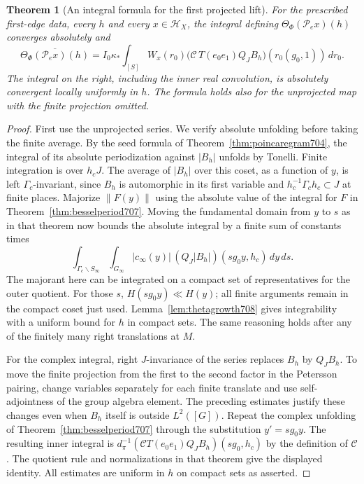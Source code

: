 \documentclass[a4paper,11pt]{article}
\newtheorem{theorem}[proposition]{Theorem}
\theoremstyle{definition}
\theoremstyle{remark}
\numberwithin{equation}{section}
\begin{document}
\begin{theorem}[An integral formula for the first projected lift]\leavevmode
\label{thm:firstlift708}
For the prescribed first-edge data, every \(h\) and every
\(x\in\mathcal H_X\), the integral defining
\(\Theta_\Phi(\mathcal P_e x)(h)\) converges absolutely and
\[
  \overline{\Theta_\Phi(\mathcal P_e x)(h)}
       = I_0\kappa_* \int_{[S]} W_x(r_0)
           \big(\mathcal C\,T(e_0e_1)Q_J B_h\big)
                           (r_0(g_0,1))\,dr_0 .
\]
The integral on the right, including the inner real
convolution, is absolutely convergent locally uniformly in
\(h\). The formula holds also for the unprojected map with the
finite projection omitted.
\end{theorem}
\begin{proof}
First use the unprojected series. We verify absolute
unfolding before taking the finite average. By the seed
formula of Theorem~\ref{thm:poincaregram704}, the integral
of its absolute periodization against \(|B_h|\) unfolds by
Tonelli. Finite integration is over \(h_cJ\). The average
of \(|B_h|\) over this coset, as a function of \(y\), is
left \(\Gamma_c\)-invariant, since \(B_h\) is automorphic
in its first variable and \(h_c^{-1}\Gamma_ch_c\subset J\)
at finite places. Majorize
\(\|F(y)\|\) using the absolute value of the integral for
\(F\) in Theorem~\ref{thm:besselperiod707}. Moving the
fundamental domain from \(y\) to \(s\) as in that theorem
now bounds the absolute integral by a finite sum of
constants times
\[
   \int_{\Gamma_c\backslash S_\infty}\int_{G_\infty}
      |c_\infty(y)|\, (Q_J|B_h|)(sg_0y,h_c)\,dy\,ds .
\]
The majorant here can be integrated on a compact set of
representatives for the outer quotient. For those \(s\),
\(H(sg_0y)\ll H(y)\); all finite arguments remain in the
compact coset just used. Lemma~\ref{lem:thetagrowth708}
gives integrability with a uniform bound for \(h\) in compact
sets. The same reasoning holds after any of the finitely many
right translations at \(M\).

For the complex integral, right \(J\)-invariance of the
series replaces \(B_h\) by \(Q_J B_h\). To move the finite
projection from the first to the second factor in the
Petersson pairing, change variables separately for each
finite translate and use self-adjointness of the group
algebra element. The preceding estimates justify these
changes even when \(B_h\) itself is outside \(L^2([G])\).
Repeat the complex unfolding of
Theorem~\ref{thm:besselperiod707} through the substitution
\(y'=sg_0y\). The resulting inner integral is
\(d_\pi^{-1}(\mathcal C T(e_0e_1)Q_J B_h)(sg_0,h_c)\)
by the definition of \(\mathcal C\). The quotient rule and
normalizations in that theorem give the displayed identity.
All estimates are uniform in \(h\) on compact sets as
asserted.
\end{proof}
\end{document}
